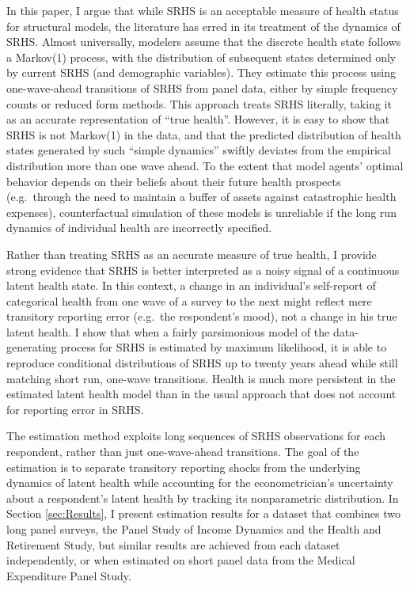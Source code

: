 \documentclass[12pt,pdftex,letterpaper]{article}
\begin{document}
In this paper, I argue that while SRHS is an acceptable measure of health status for structural models, the literature has erred in its treatment of the dynamics of SRHS.  Almost universally, modelers assume that the discrete health state follows a Markov(1) process, with the distribution of subsequent states determined only by current SRHS (and demographic variables). They estimate this process using one-wave-ahead transitions of SRHS from panel data, either by simple frequency counts or reduced form methods. This approach treats SRHS literally, taking it as an accurate representation of ``true health''.  However, it is easy to show that SRHS is not Markov(1) in the data, and that the predicted distribution of health states generated by such ``simple dynamics'' swiftly deviates from the empirical distribution more than one wave ahead.  To the extent that model agents' optimal behavior depends on their beliefs about their future health prospects (e.g.\ through the need to maintain a buffer of assets against catastrophic health expenses), counterfactual simulation of these models is unreliable if the long run dynamics of individual health are incorrectly specified.

Rather than treating SRHS as an accurate measure of true health, I provide strong evidence that SRHS is better interpreted as a noisy signal of a continuous latent health state.  In this context, a change in an individual's self-report of categorical health from one wave of a survey to the next might reflect mere transitory reporting error (e.g.\ the respondent's mood), not a change in his true latent health.  I show that when a fairly parsimonious model of the data-generating process for SRHS is estimated by maximum likelihood, it is able to reproduce conditional distributions of SRHS up to twenty years ahead while still matching short run, one-wave transitions.  Health is much more persistent in the estimated latent health model than in the usual approach that does not account for reporting error in SRHS.

The estimation method exploits long sequences of SRHS observations for each respondent, rather than just one-wave-ahead transitions. The goal of the estimation is to separate transitory reporting shocks from the underlying dynamics of latent health while accounting for the econometrician's uncertainty about a respondent's latent health by tracking its nonparametric distribution.  In Section \ref{sec:Results}, I present estimation results for a dataset that combines two long panel surveys, the Panel Study of Income Dynamics and the Health and Retirement Study, but similar results are achieved from each dataset independently, or when estimated on short panel data from the Medical Expenditure Panel Study.
\end{document}
